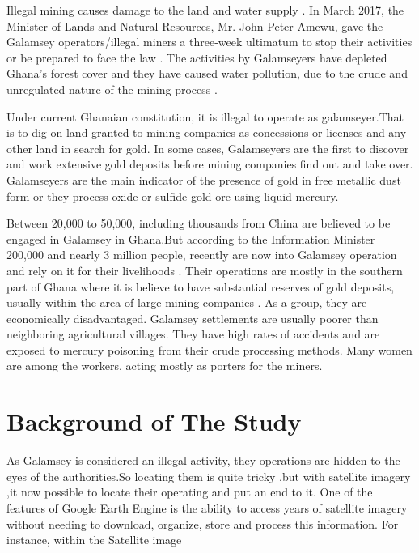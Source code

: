 Illegal mining causes damage to the land and water supply \parencite{Ansah2017} . In March 2017, the Minister of Lands and Natural Resources, Mr. John Peter Amewu, gave the Galamsey operators/illegal miners a three-week ultimatum to stop their activities or be prepared to face the law \parencite{Allotey2017} . The activities by Galamseyers have depleted Ghana's forest cover and they have caused water pollution, due to the crude and unregulated nature of the mining process \parencite{gyekye}.

Under current Ghanaian constitution, it is illegal to operate as galamseyer.That is to dig on land granted to mining companies as concessions or licenses and any other land in search for gold. In some cases, Galamseyers are the first to discover and work extensive gold deposits before mining companies find out and take over. Galamseyers are the main indicator of the presence of gold in free metallic dust form or they process oxide or sulfide gold ore using liquid mercury.

Between 20,000 to 50,000, including thousands from China are believed to be engaged in Galamsey in Ghana.But according to the Information Minister 200,000 and nearly 3 million people, recently are now into Galamsey operation and rely on it for their livelihoods \parencite{goldgu2017}. Their operations are mostly in the southern part of Ghana where it is believe to have substantial reserves of gold deposits, usually within the area of large mining companies \parencite{Barenblitt2021} . As a group, they are economically disadvantaged. Galamsey settlements are usually poorer than neighboring agricultural villages. They have high rates of accidents and are exposed to mercury poisoning from their crude processing methods. Many women are among the workers, acting mostly as porters for the miners.

\section{Background of The Study}

As Galamsey is considered an illegal activity, they operations are hidden to the eyes of the authorities.So locating them is quite tricky ,but with satellite imagery ,it now possible to locate their operating and put an end to it. One of the features of Google Earth Engine is the ability to access years of satellite imagery without needing to download, organize, store and process this information. For instance, within the Satellite image

